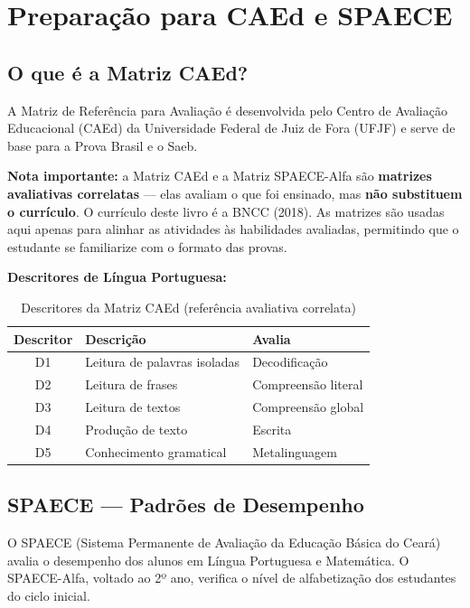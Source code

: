 
\chapter{Preparação para CAEd e SPAECE}

\section{O que é a Matriz CAEd?}

A Matriz de Referência para Avaliação é desenvolvida pelo Centro de Avaliação Educacional (CAEd) da Universidade Federal de Juiz de Fora (UFJF) e serve de base para a Prova Brasil e o Saeb.

\textbf{Nota importante:} a Matriz CAEd e a Matriz SPAECE-Alfa são \textbf{matrizes avaliativas correlatas} — elas avaliam o que foi ensinado, mas \textbf{não substituem o currículo}. O currículo deste livro é a BNCC (2018). As matrizes são usadas aqui apenas para alinhar as atividades às habilidades avaliadas, permitindo que o estudante se familiarize com o formato das provas.

\textbf{Descritores de Língua Portuguesa:}

\begin{table}[h]
\centering
\caption{Descritores da Matriz CAEd (referência avaliativa correlata)}
\begin{tabular}{|c|p{5cm}|p{4cm}|}
\hline
\textbf{Descritor} & \textbf{Descrição} & \textbf{Avalia} \\
\hline
D1 & Leitura de palavras isoladas & Decodificação \\
\hline
D2 & Leitura de frases & Compreensão literal \\
\hline
D3 & Leitura de textos & Compreensão global \\
\hline
D4 & Produção de texto & Escrita \\
\hline
D5 & Conhecimento gramatical & Metalinguagem \\
\hline
\end{tabular}
\end{table}

\section{SPAECE --- Padrões de Desempenho}

O SPAECE (Sistema Permanente de Avaliação da Educação Básica do Ceará) avalia o desempenho dos alunos em Língua Portuguesa e Matemática. O SPAECE-Alfa, voltado ao 2º ano, verifica o nível de alfabetização dos estudantes do ciclo inicial.

